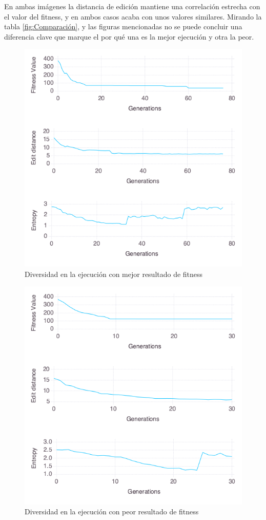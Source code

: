 En ambas imágenes la distancia de edición mantiene una correlación estrecha con el valor del fitness, y en ambos casos acaba con unos valores similares. Mirando la tabla \ref{fig:Comparación}, y las figuras
mencionadas no se puede concluir una diferencia clave que marque el por qué una es la mejor ejecución y otra la peor.

\begin{figure}[]
	\centering	
	\includegraphics[scale=0.5]{../data/Plots/config_file_5_Rastrigin_best_f_value.png}
	\caption{ Diversidad en la ejecución con mejor resultado de fitness }
    \label{fig:best_f_value}
\end{figure}

\begin{figure}[]
	\centering	
	\includegraphics[scale=0.5]{../data/Plots/config_file_5_Rastrigin_worst_f_value.png}
	\caption{ Diversidad en la ejecución con peor resultado de fitness }
    \label{fig:worst_f_value}
\end{figure}
